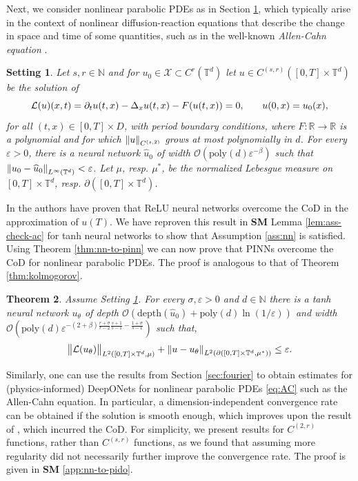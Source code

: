 \documentclass{article}
\numberwithin{equation}{section}
\newcommand{\poly}{\mathrm{poly}}
\newcommand{\T}{\mathbb{T}}
\newcommand{\R}{\mathbb{R}}
\newcommand{\N}{\mathbb{N}}
\newcommand{\cL}{\mathcal{L}}
\newcommand{\cX}{\mathcal{X}}
\newcommand{\uhat}{{\widehat{u}}}
\renewcommand{\epsilon}{\varepsilon}
\newcommand{\1}{\mathbbm{1}}
\newcommand{\bigO}{\mathcal{O}}
\newtheorem{theorem}{Theorem}[section]
\newtheorem{setting}[theorem]{Setting}%
\begin{document}
Next, we consider nonlinear parabolic PDEs as in Section \ref{set:AC}, which  typically arise in the context of nonlinear diffusion-reaction equations that describe the change in space and time of some quantities, such as in the well-known \emph{Allen-Cahn equation} \cite{allen1979microscopic}. 
\begin{setting}\label{set:AC}
Let $s,r\in\N$ and for $u_0\in \cX\subset C^r(\T^d)$ let $u\in  C^{(s,r)}([0,T]\times \T^d)$ be the solution of
\begin{equation}\label{eq:AC}
   {\color{black}\cL (u)(x,t) =  \partial_t u(t,x) - \Delta_x u(t,x) - F(u(t,x))=0, }\qquad u(0,x)=u_0(x), 
\end{equation}
for all $(t,x)\in [0,T] \times D$, with period boundary conditions, where $F:\R\to\R$ is a polynomial and for which $\norm{u}_{C^{(s,2)}}$ grows at most polynomially in $d$. For every $\epsilon>0$, there is a neural network $\uhat_0$ of width $\bigO(\poly(d)\epsilon^{-\beta})$ such that $\norm{u_0-\uhat_0}_{L^\infty(\T^d)}<\epsilon$. Let $\mu$, resp. $\mu^*$, be the normalized Lebesgue measure on $[0,T]\times \T^d$, resp. $\partial([0,T]\times \T^d)$.  
\end{setting}
In \cite{hutzenthaler2020proof} the authors have proven that ReLU neural networks overcome the CoD in the approximation of $u(T)$. We have reproven this result in {\bf SM} Lemma \ref{lem:ass-check-ac} for tanh neural networks to show that Assumption \ref{ass:nn} is satisfied. Using Theorem \ref{thm:nn-to-pinn} we can now prove that PINNs overcome the CoD for nonlinear parabolic PDEs. The proof is analogous to that of Theorem \ref{thm:kolmogorov}.
\begin{theorem}\label{thm:AC-pinn}
Assume Setting \ref{set:AC}. For every $\sigma, \epsilon>0$ and $d\in\N$ there is a tanh neural network $u_\theta$ of depth $\bigO(\mathrm{depth}(\uhat_0)+\poly(d)\ln(1/\epsilon))$ and width $\bigO(\poly(d)\epsilon^{-(2+\beta)\frac{r+\sigma}{r-2}\frac{s+1}{s-1}-\frac{1+\sigma}{s-1}})$ such that,
\begin{equation}
     \norm{\cL(u_\theta)}_{L^2([0,T]\times\T^d, \mu)} + \norm{u-u_\theta}_{L^2(\partial([0,T]\times\T^d, \mu^*))} \leq  \epsilon. 
\end{equation}
\end{theorem}

Similarly, one can use the results from Section \ref{sec:fourier} to obtain estimates for (physics-informed) DeepONets for nonlinear parabolic PDEs \eqref{eq:AC} such as the Allen-Cahn equation. In particular, a dimension-independent convergence rate can be obtained if the solution is smooth enough, which improves upon the result of \cite{LMK1}, which incurred the CoD. For simplicity, we present results for $C^{(2,r)}$ functions, rather than $C^{(s,r)}$ functions, as we found that assuming more regularity did not necessarily further improve the convergence rate. The proof is given in \textbf{SM} \ref{app:nn-to-pido}. 
\end{document}
